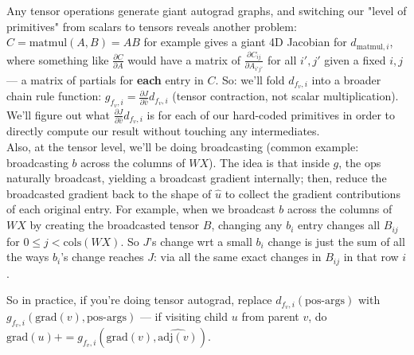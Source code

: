 \documentclass[12pt]{article}
\begin{document}
\begin{outline}
Any tensor operations generate giant autograd graphs, and switching our "level of primitives" from scalars to tensors reveals another problem: $C = \text{matmul}(A,B) = AB$ for example gives a giant 4D Jacobian for $d_{\text{matmul},i}$, where something like $\displaystyle \frac{\partial C}{\partial A}$ would have a matrix of $\displaystyle \frac{\partial C_{ij}}{\partial A_{i' j'}}$ for all $i',j'$ given a fixed $i,j$ --- a matrix of partials for \textbf{each} entry in $C$. So: we'll fold $d_{f_v,i}$ into a broader chain rule function: $\displaystyle g_{f_v,i} = \frac{\partial J}{\partial \hat v} d_{f_v,i}$ (tensor contraction, not scalar multiplication). We'll figure out what $\displaystyle \frac{\partial J}{\partial \hat v} d_{f_v,i}$ is for each of our hard-coded primitives in order to directly compute our result without touching any intermediates. \\

Also, at the tensor level, we'll be doing broadcasting (common example: broadcasting $b$ across the columns of $WX$). The idea is that inside $g$, the ops naturally broadcast, yielding a broadcast gradient internally; then, reduce the broadcasted gradient back to the shape of $\hat u$ to collect the gradient contributions of each original entry.
\1 For example, when we broadcast $b$ across the columns of $WX$ by creating the broadcasted tensor $B$, changing any $b_i$ entry changes all $B_{ij}$ for $0 \le j < \text{cols}(WX)$. So $J$'s change wrt a small $b_i$ change is just the sum of all the ways $b_i$'s change reaches $J$: via all the same exact changes in $B_{ij}$ in that row $i$.
\\\0

So in practice, if you're doing tensor autograd, replace $d_{f_v,i}(\text{pos-args})$ with $g_{f_v,i}(\text{grad}(v), \text{pos-args})$ --- if visiting child $u$ from parent $v$, do $\boxed{\text{grad}(u) += g_{f_v,i}\left(\text{grad}(v), \hat{\text{adj}(v)}\right)}$. \\


\end{outline}
\end{document}
